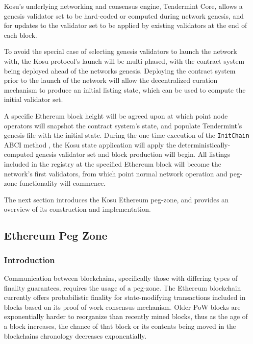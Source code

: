 \documentclass[10pt]{article}
\begin{document}
Kosu’s underlying networking and consensus engine, Tendermint Core, allows a genesis validator set to be hard-coded or computed during network genesis, and for updates to the validator set to be applied by existing validators at the end of each block\cite{tendermint-abci-apps}.
\medskip

To avoid the special case of selecting genesis validators to launch the network with, the Kosu protocol’s launch will be multi-phased, with the contract system being deployed ahead of the networks genesis. Deploying the contract system prior to the launch of the network will allow the decentralized curation mechanism to produce an initial listing state, which can be used to compute the initial validator set. 
\medskip

A specific Ethereum block height will be agreed upon at which point node operators will snapshot the contract system’s state, and populate Tendermint’s genesis file with the initial state. During the one-time execution of the \texttt{InitChain} ABCI method \cite{tendermint-abci-apps}, the Kosu state application will apply the deterministically-computed genesis validator set and block production will begin. All listings included in the registry at the specified Ethereum block will become the network’s first validators, from which point normal network operation and peg-zone functionality will commence.
\medskip

The next section introduces the Kosu Ethereum peg-zone, and provides an overview of its construction and implementation.

\subsection{Ethereum Peg Zone}\label{peg}
\subsubsection{Introduction}\label{peg-intro}
Communication between blockchains, specifically those with differing types of finality guarantees, requires the usage of a peg-zone. The Ethereum blockchain currently offers probabilistic finality for state-modifying transactions included in blocks based on its proof-of-work consensus mechanism. Older PoW blocks are exponentially harder to reorganize\cite{blockchain-taxonomy} than recently mined blocks, thus as the age of a block increases, the chance of that block or its contents being moved in the blockchains chronology decreases exponentially.
\medskip
\end{document}
